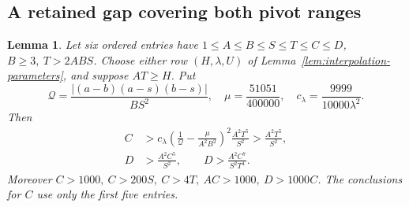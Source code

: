 \documentclass[12pt]{article}
\newtheorem{lemma}[theorem]{Lemma}
\numberwithin{equation}{section}
\begin{document}
\subsection{A retained gap covering both pivot ranges}
\begin{lemma}\label{lem:retained-gap}
Let six ordered entries have \(1\le A\le B\le S\le T\le C\le D\),
\(B\ge3,\ T>2ABS\). Choose either row \((H,\lambda,U)\) of
Lemma~\ref{lem:interpolation-parameters}, and suppose \(AT\ge H\).
Put
\[
 \mathcal Q=\frac{|(a-b)(a-s)(b-s)|}{BS^2},\quad
 \mu=\frac{51051}{400000},\quad c_\lambda=\frac{9999}{10000\lambda^2}.
\]
Then
\begin{align}
 C&>c_\lambda\left(\frac1{\mathcal Q}-\frac{\mu}{A^2B^2}\right)^2
                     \frac{A^2T^5}{S^2}
   >\frac{A^2T^5}{S^2},                                      \label{eq:retained-main}\\
 D&>\frac{A^2C^5}{S^2},\qquad
 D>\frac{A^2C^7}{S^2T^4}.                                    \label{eq:retained-start}
\end{align}
Moreover \(C>1000,\ C>200S,\ C>4T,\ AC>1000,\ D>1000C\).
The conclusions for \(C\) use only the first five entries.
\end{lemma}
\end{document}
